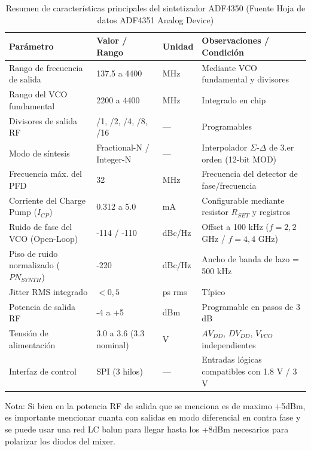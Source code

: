 \documentclass[11pt,a4paper,twoside]{report}
\begin{document}
	\begin{table}[htbp]
		\centering
		\label{tab:adf4350_caracteristicas}
		\begin{tabularx}{\textwidth}{l l l X}
			\toprule
			\textbf{Parámetro} & \textbf{Valor / Rango} & \textbf{Unidad} & \textbf{Observaciones / Condición} \\
			\midrule
			Rango de frecuencia de salida & 137.5 a 4400 & MHz & Mediante VCO fundamental y divisores \\
			Rango del VCO fundamental & 2200 a 4400 & MHz & Integrado en chip \\
			Divisores de salida RF & /1, /2, /4, /8, /16 & --- & Programables \\
			Modo de síntesis & Fractional-N / Integer-N & --- & Interpolador $\Sigma$-$\Delta$ de 3.er orden (12-bit MOD) \\
			Frecuencia máx. del PFD & 32 & MHz & Frecuencia del detector de fase/frecuencia \\
			Corriente del Charge Pump ($I_{CP}$) & 0.312 a 5.0 & mA & Configurable mediante resistor $R_{SET}$ y registros \\
			Ruido de fase del VCO (Open-Loop) & -114 / -110 & dBc/Hz & Offset a 100 kHz ($f = 2,2$ GHz / $f = 4,4$ GHz) \\
			Piso de ruido normalizado ($PN_{SYNTH}$) & -220 & dBc/Hz & Ancho de banda de lazo = 500 kHz \\
			Jitter RMS integrado & $< 0,5$ & ps rms & Típico \\
			Potencia de salida RF & -4 a +5 & dBm & Programable en pasos de 3 dB \\
			Tensión de alimentación & 3.0 a 3.6 (3.3 nominal) & V & $AV_{DD}$, $DV_{DD}$, $V_{VCO}$ independientes \\
			Interfaz de control & SPI (3 hilos) & --- & Entradas lógicas compatibles con 1.8 V / 3 V \\
			\bottomrule
		\end{tabularx}
		\caption{Resumen de características principales del sintetizador ADF4350 (Fuente Hoja de datos ADF4351 Analog Device)}
	\end{table}
	
	Nota: Si bien en la potencia RF de salida que se menciona es de maximo +5dBm, es importante mencionar cuanta con salidas en modo diferencial en contra fase y se puede usar una red LC balun para llegar hasta los +8dBm necesarios para polarizar los diodos del mixer. \newpage 
	
\end{document}
